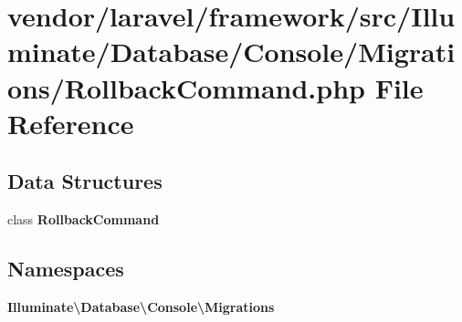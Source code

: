 \section{vendor/laravel/framework/src/\+Illuminate/\+Database/\+Console/\+Migrations/\+Rollback\+Command.php File Reference}
\label{_rollback_command_8php}
\subsection*{Data Structures}
\begin{DoxyCompactItemize}
\item 
class {\bf Rollback\+Command}
\end{DoxyCompactItemize}
\subsection*{Namespaces}
\begin{DoxyCompactItemize}
\item 
 {\bf Illuminate\textbackslash{}\+Database\textbackslash{}\+Console\textbackslash{}\+Migrations}
\end{DoxyCompactItemize}
